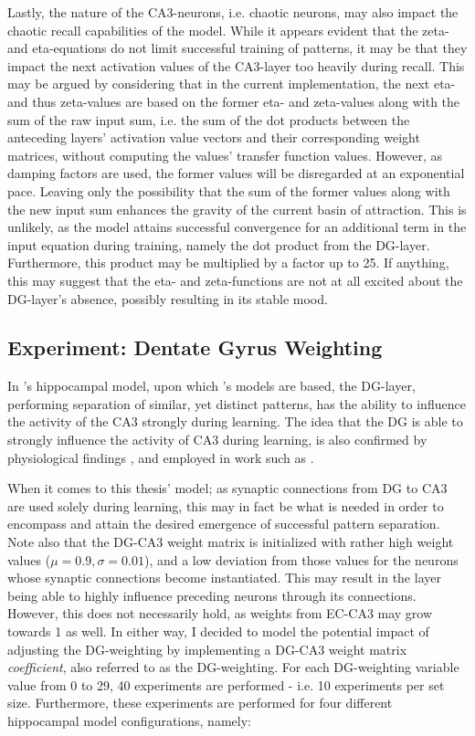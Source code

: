 Lastly, the nature of the CA3-neurons, i.e. chaotic neurons, may also impact the chaotic recall capabilities of the model. While it appears evident that the zeta- and eta-equations do not limit successful training of patterns, it may be that they impact the next activation values of the CA3-layer too heavily during recall. This may be argued by considering that in the current implementation, the next eta- and thus zeta-values are based on the former eta- and zeta-values along with the sum of the raw input sum, i.e. the sum of the dot products between the anteceding layers' activation value vectors and their corresponding weight matrices, without computing the values' transfer function values. 
However, as damping factors are used, the former values will be disregarded at an exponential pace. Leaving only the possibility that the sum of the former values along with the new input sum enhances the gravity of the current basin of attraction. This is unlikely, as the model attains successful convergence for an additional term in the input equation during training, namely the dot product from the DG-layer. Furthermore, this product may be multiplied by a factor up to 25. If anything, this may suggest that the eta- and zeta-functions are not at all excited about the DG-layer's absence, possibly resulting in its stable mood.


\subsection{Experiment: Dentate Gyrus Weighting}

In \citeauthor{Wakagi2008}'s \citeyear{Wakagi2008} hippocampal model, upon which \citeauthor{Hattori2010}'s \citeyear{Hattori2010, Hattori2014} models are based, the DG-layer, performing separation of similar, yet distinct patterns, has the ability to influence the activity of the CA3 strongly during learning. The idea that the DG is able to strongly influence the activity of CA3 during learning, is also confirmed by physiological findings \citep{Rolls1998chpt6}, and employed in work such as \citep{Norman2003}.

When it comes to this thesis' model; as synaptic connections from DG to CA3 are used solely during learning, this may in fact be what is needed in order to encompass and attain the desired emergence of successful pattern separation. Note also that the DG-CA3 weight matrix is initialized with rather high weight values ($\mu=0.9, \sigma=0.01$), and a low deviation from those values for the neurons whose synaptic connections become instantiated. This may result in the layer being able to highly influence preceding neurons through its connections. However, this does not necessarily hold, as weights from EC-CA3 may grow towards 1 as well. In either way, I decided to model the potential impact of adjusting the DG-weighting by implementing a DG-CA3 weight matrix \textit{coefficient}, also referred to as the DG-weighting. For each DG-weighting variable value from 0 to 29, 40 experiments are performed - i.e. 10 experiments per set size. Furthermore, these experiments are performed for four different hippocampal model configurations, namely:

